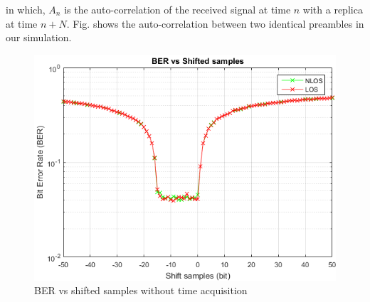 \documentclass[a4paper]{article}
\begin{document}
    in which, $A_n$ is the auto-correlation of the received signal at time $n$ with a replica at time $n+N$. Fig. shows the auto-correlation between two identical preambles in our simulation.

	\vspace*{+5mm}
	
    \begin{figure}[h]
		\centering
		\includegraphics[scale=0.6]{figures/BERvsshiftedNoTA.png}	
		\centering
		\caption{BER vs shifted samples without time acquisition}
		\label{fig:BERvsshiftedNoTA}
		\end{figure}
        
\end{document}
